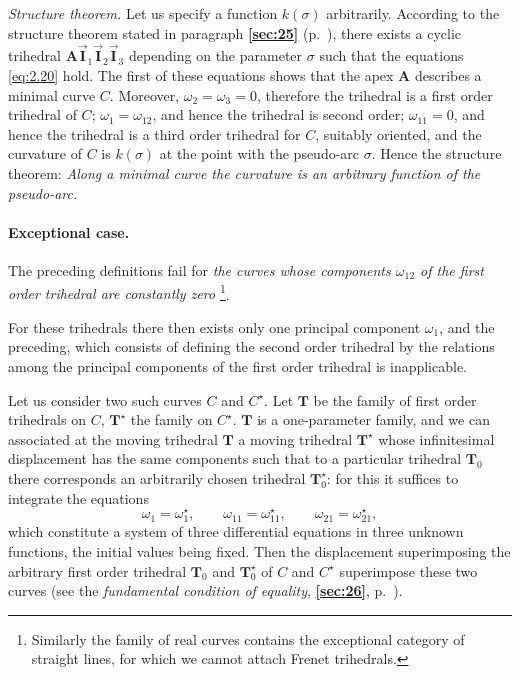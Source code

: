 \documentclass[leqno,11pt]{book}
\numberwithin{equation}{chapter}
\theoremstyle{shape1}
\theoremstyle{shapesmall}
\newcommand{\fsref}[1]{{\rm\textsection\textbf{\ref{sec:#1}}}}
\newcommand{\str}{^{\star}}
\newcommand{\rvec}[1]{\vec{\mathbf{#1}}}
\newcommand{\ivec}{\rvec{I}}
\begin{document}
\emph{Structure theorem.} Let us specify a function $k(\sigma)$ arbitrarily. According to the structure theorem stated in paragraph \fsref{25} (p.~\pageref{sec:25}), there exists a cyclic trihedral $\mathbf{A}\ivec_{1}\ivec_{2}\ivec_{3}$ depending on the parameter $\sigma$ such that the equations \eqref{eq:2.20} hold. The first of these equations shows that the apex $\mathbf{A}$ describes a minimal curve $C$. Moreover, $\omega_{2}=\omega_{3}=0$, therefore the trihedral is a first order trihedral of $C$; $\omega_{1}=\omega_{12}$, and hence the trihedral is second order; $\omega_{11}=0$, and hence the trihedral is a third order trihedral for $C$, suitably oriented, and the curvature of $C$ is $k(\sigma)$ at the point with the pseudo-arc $\sigma$. Hence the structure theorem: \emph{Along a minimal curve the curvature is an arbitrary function of the pseudo-arc.}

\paragraph{Exceptional case.}
\label{sec:30}
The preceding definitions fail for \emph{the curves whose components $\omega_{12}$ of the first order trihedral are constantly zero} \footnote{Similarly the family of real curves contains the exceptional category of straight lines, for which we cannot attach Frenet trihedrals.}.

For these trihedrals there then exists only one principal component $\omega_{1}$, and the preceding, which consists of defining the second order trihedral by the relations among the principal components of the first order trihedral is inapplicable.

Let us consider two such curves $C$ and $C\str$. Let $\mathbf{T}$ be the family of first order trihedrals on $C$, $\mathbf{T}\str$ the family on $C\str$. $\mathbf{T}$ is a one-parameter family, and we can associated at the moving trihedral $\mathbf{T}$ a moving trihedral $\mathbf{T}\str$ whose infinitesimal displacement has the same components such that to a particular trihedral $\mathbf{T}_{0}$ there corresponds an arbitrarily chosen trihedral $\mathbf{T}\str_{0}$: for this it suffices to integrate the equations
\[
\omega_{1}=\omega\str_{1},\qquad\omega_{11}=\omega\str_{11},\qquad\omega_{21}=\omega_{21}\str,
\]
which constitute a system of three differential equations in three unknown functions, the initial values being fixed. Then the displacement superimposing the arbitrary first order trihedral $\mathbf{T}_{0}$ and $\mathbf{T}\str_{0}$ of $C$ and $C\str$ superimpose these two curves (see the \emph{fundamental condition of equality}, \fsref{26}, p.~\pageref{sec:26}).
\end{document}
